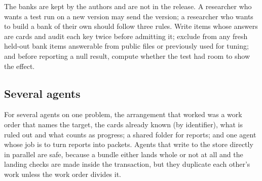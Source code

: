 The banks are kept by the authors and are not in the release. A researcher who wants a test run on a new version may send the version; a researcher who wants to build a bank of their own should follow three rules. Write items whose answers are cards and audit each key twice before admitting it; exclude from any fresh held-out bank items answerable from public files or previously used for tuning; and before reporting a null result, compute whether the test had room to show the effect.

\subsection{Several agents}
For several agents on one problem, the arrangement that worked was a work order that names the target, the cards already known (by identifier), what is ruled out and what counts as progress; a shared folder for reports; and one agent whose job is to turn reports into packets. Agents that write to the store directly in parallel are safe, because a bundle either lands whole or not at all and the landing checks are made inside the transaction, but they duplicate each other's work unless the work order divides it.
